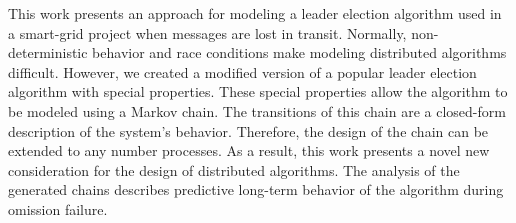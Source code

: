 
This work presents an approach for modeling a leader election algorithm used in a smart-grid project when messages are lost in transit.
Normally, non-deterministic behavior and race conditions make modeling distributed algorithms difficult.
However, we created a modified version of a popular leader election algorithm with special properties.
These special properties allow the algorithm to be modeled using a Markov chain.
The transitions of this chain are a closed-form description of the system's behavior.
Therefore, the design of the chain can be extended to any number processes.
As a result, this work presents a novel new consideration for the design of distributed algorithms.
The analysis of the generated chains describes predictive long-term behavior of the algorithm during omission failure.
